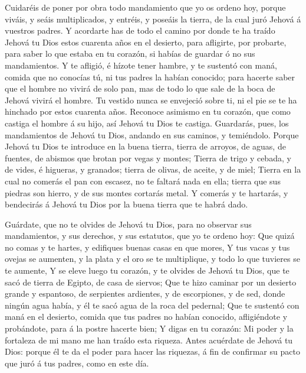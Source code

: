  Cuidaréis de poner por obra todo mandamiento que yo os
ordeno hoy, porque viváis, y seáis multiplicados, y entréis, y poseáis
la tierra, de la cual juró Jehová á vuestros padres.  Y
acordarte has de todo el camino por donde te ha traído Jehová tu Dios
estos cuarenta años en el desierto, para afligirte, por probarte, para
saber lo que estaba en tu corazón, si habías de guardar ó no sus
mandamientos.  Y te afligió, é hízote tener hambre, y te
sustentó con maná, comida que no conocías tú, ni tus padres la habían
conocido; para hacerte saber que el hombre no vivirá de solo pan, mas de
todo lo que sale de la boca de Jehová vivirá el hombre.  Tu
vestido nunca se envejeció sobre ti, ni el pie se te ha hinchado por
estos cuarenta años.  Reconoce asimismo en tu corazón, que
como castiga el hombre á su hijo, así Jehová tu Dios te castiga.
 Guardarás, pues, los mandamientos de Jehová tu Dios,
andando en sus caminos, y temiéndolo.  Porque Jehová tu Dios
te introduce en la buena tierra, tierra de arroyos, de aguas, de
fuentes, de abismos que brotan por vegas y montes;  Tierra
de trigo y cebada, y de vides, é higueras, y granados; tierra de olivas,
de aceite, y de miel;  Tierra en la cual no comerás el pan
con escasez, no te faltará nada en ella; tierra que sus piedras son
hierro, y de sus montes cortarás metal.  Y comerás y te
hartarás, y bendecirás á Jehová tu Dios por la buena tierra que te habrá
dado.

 Guárdate, que no te olvides de Jehová tu Dios, para no
observar sus mandamientos, y sus derechos, y sus estatutos, que yo te
ordeno hoy:  Que quizá no comas y te hartes, y edifiques
buenas casas en que mores,  Y tus vacas y tus ovejas se
aumenten, y la plata y el oro se te multiplique, y todo lo que tuvieres
se te aumente,  Y se eleve luego tu corazón, y te olvides
de Jehová tu Dios, que te sacó de tierra de Egipto, de casa de siervos;
 Que te hizo caminar por un desierto grande y espantoso, de
serpientes ardientes, y de escorpiones, y de sed, donde ningún agua
había, y él te sacó agua de la roca del pedernal;  Que te
sustentó con maná en el desierto, comida que tus padres no habían
conocido, afligiéndote y probándote, para á la postre hacerte bien;
 Y digas en tu corazón: Mi poder y la fortaleza de mi mano
me han traído esta riqueza.  Antes acuérdate de Jehová tu
Dios: porque él te da el poder para hacer las riquezas, á fin de
confirmar su pacto que juró á tus padres, como en este día.

